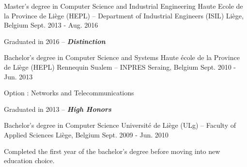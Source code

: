 
\begin{cventries}

  \cventry
    {Master's degree in Computer Science and Industrial Engineering} %
    {Haute Ecole de la Province de Liège (HEPL) -- Department of Industrial Engineers (ISIL)} %
    {Liège, Belgium} %
    {Sept. 2013 - Aug. 2016} %
    {
      \begin{cvitems} %
        \item{Graduated in 2016 -- \textbf{\textit{Distinction}}}
      \end{cvitems}
    }

  \cventry
    {Bachelor's degree in Computer Science and Systems} %
    {Haute école de la Province de Liège (HEPL) Rennequin Sualem -- INPRES} %
    {Seraing, Belgium} %
    {Sept. 2010 - Jun. 2013} %
    {
      \begin{cvitems} %
        \item{Option : Networks and Telecommunications}
        \item{Graduated in 2013 -- \textbf{\textit{High Honors}}}
      \end{cvitems}
    }

  \cventry
    {Bachelor's degree in Computer Science} %
    {Université de Liège (ULg) -- Faculty of Applied Sciences} %
    {Liège, Belgium} %
    {Sept. 2009 - Jun. 2010} %
    {
      \begin{cvitems} %
        \item{Completed the first year of the bachelor's degree before moving into new education choice.}
      \end{cvitems}
    }

\end{cventries}



